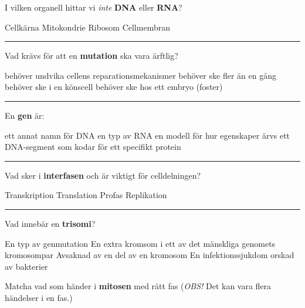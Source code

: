 \documentclass{exam}
\begin{document}
\begin{questions}
\question I vilken organell hittar vi \textit{inte} \textbf{DNA} eller \textbf{RNA}?
\begin{checkboxes}
   \choice Cellkärna
   \choice Mitokondrie
   \choice Ribosom
   \choice Cellmembran
\end{checkboxes}
\vspace{5mm} %
\hrule 
\vspace{5mm} %
\question Vad krävs för att en \textbf{mutation} ska vara ärftlig? 
\begin{checkboxes}
   \choice behöver undvika cellens reparationsmekanismer
   \choice behöver ske fler än en gång
   \choice behöver ske i en könscell
   \choice behöver ske hos ett embryo (foster)
\end{checkboxes}

\vspace{5mm} %
\hrule 
\vspace{5mm} %
\question En \textbf{gen} är:  
\begin{checkboxes}
   \choice ett annat namn för DNA
   \choice en typ av RNA
   \choice en modell för hur egenskaper ärvs
   \choice ett DNA-segment som kodar för ett specifikt protein
\end{checkboxes}

\vspace{5mm} %
\hrule 
\vspace{5mm} %
\question  Vad sker i \textbf{interfasen} och är viktigt för celldelningen?
\begin{checkboxes}
   \choice Transkription
   \choice Translation
   \choice Profas
   \choice Replikation
\end{checkboxes}


\vspace{5mm} %
\hrule 
\vspace{5mm} %
\question  Vad innebär en \textbf{trisomi}?
\begin{checkboxes}
   \choice En typ av genmutation
   \choice En extra kromsom i ett av det mänskliga genomets kromosompar
   \choice Avsaknad av en del av en kromosom
   \choice En infektionssjukdom orskad av bakterier
\end{checkboxes}
\break



\vspace{5mm} %
\begin{center}
\end{center}
\vspace{5mm} %
\question Matcha vad som händer i \textbf{mitosen} med rätt fas (\textit{OBS!} Det kan vara flera händelser i en fas.) 


\end{questions}
\end{document}
